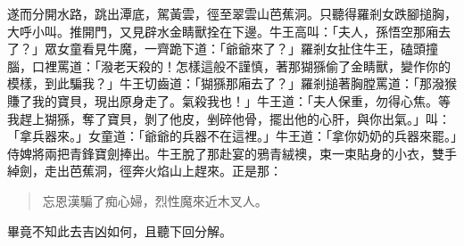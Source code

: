 遂而分開水路，跳出潭底，駕黃雲，徑至翠雲山芭蕉洞。只聽得羅剎女跌腳搥胸，大呼小叫。推開門，又見辟水金睛獸拴在下邊。牛王高叫：「夫人，孫悟空那廂去了？」眾女童看見牛魔，一齊跪下道：「爺爺來了？」羅剎女扯住牛王，磕頭撞腦，口裡罵道：「潑老天殺的！怎樣這般不謹慎，著那猢猻偷了金睛獸，變作你的模樣，到此騙我？」牛王切齒道：「猢猻那廂去了？」羅剎搥著胸膛罵道：「那潑猴賺了我的寶貝，現出原身走了。氣殺我也！」牛王道：「夫人保重，勿得心焦。等我趕上猢猻，奪了寶貝，剝了他皮，剉碎他骨，擺出他的心肝，與你出氣。」叫：「拿兵器來。」女童道：「爺爺的兵器不在這裡。」牛王道：「拿你奶奶的兵器來罷。」侍婢將兩把青鋒寶劍捧出。牛王脫了那赴宴的鴉青絨襖，束一束貼身的小衣，雙手綽劍，走出芭蕉洞，徑奔火焰山上趕來。正是那：
\begin{quote}
忘恩漢騙了痴心婦，烈性魔來近木叉人。
\end{quote}

畢竟不知此去吉凶如何，且聽下回分解。
